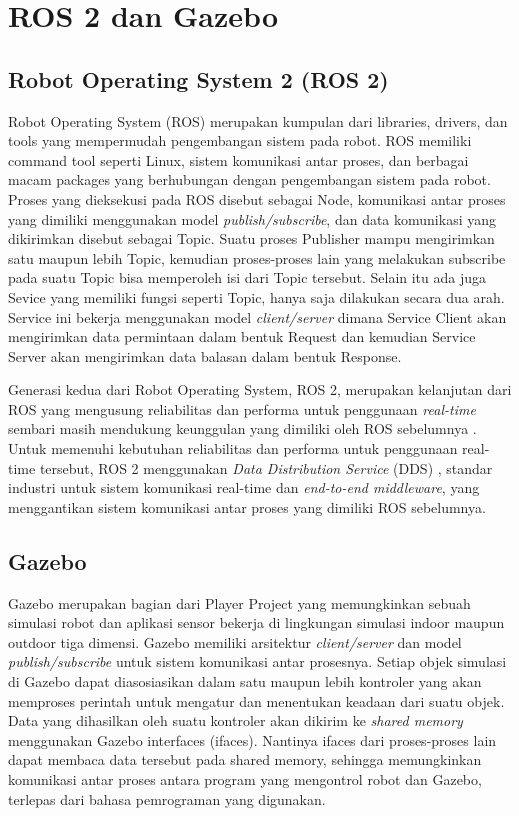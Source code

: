 \section{ROS 2 dan Gazebo}
\label{sec:rosgazebo}

\subsection{Robot Operating System 2 (ROS 2)}
\label{subsec:ros2}

Robot Operating System (ROS) \citep{quigley2009} merupakan kumpulan dari libraries, drivers, dan tools yang mempermudah pengembangan sistem pada robot.
ROS memiliki command tool seperti Linux, sistem komunikasi antar proses, dan berbagai macam packages yang berhubungan dengan pengembangan sistem pada robot.
Proses yang dieksekusi pada ROS disebut sebagai Node, komunikasi antar proses yang dimiliki menggunakan model \emph{publish/subscribe}, dan data komunikasi yang dikirimkan disebut sebagai Topic.
Suatu proses Publisher mampu mengirimkan satu maupun lebih Topic, kemudian proses-proses lain yang melakukan subscribe pada suatu Topic bisa memperoleh isi dari Topic tersebut.
Selain itu ada juga Sevice yang memiliki fungsi seperti Topic, hanya saja dilakukan secara dua arah.
Service ini bekerja menggunakan model \emph{client/server} dimana Service Client akan mengirimkan data permintaan dalam bentuk Request dan kemudian Service Server akan mengirimkan data balasan dalam bentuk Response.

Generasi kedua dari Robot Operating System, ROS 2, merupakan kelanjutan dari ROS yang mengusung reliabilitas dan performa untuk penggunaan \emph{real-time} sembari masih mendukung keunggulan yang dimiliki oleh ROS sebelumnya \citep{maruyama2016}.
Untuk memenuhi kebutuhan reliabilitas dan performa untuk penggunaan real-time tersebut, ROS 2 menggunakan \emph{Data Distribution Service} (DDS) \citep{castellote2003} \citep{schlesselman2004}, standar industri untuk sistem komunikasi real-time dan \emph{end-to-end middleware}, yang menggantikan sistem komunikasi antar proses yang dimiliki ROS sebelumnya.

\subsection{Gazebo}
\label{subsec:gazebo}

Gazebo \citep{koenig2004} merupakan bagian dari Player Project \citep{gerkey2003} yang memungkinkan sebuah simulasi robot dan aplikasi sensor bekerja di lingkungan simulasi indoor maupun outdoor tiga dimensi.
Gazebo memiliki arsitektur \emph{client/server} dan model \emph{publish/subscribe} untuk sistem komunikasi antar prosesnya.
Setiap objek simulasi di Gazebo dapat diasosiasikan dalam satu maupun lebih kontroler yang akan memproses perintah untuk mengatur dan menentukan keadaan dari suatu objek.
Data yang dihasilkan oleh suatu kontroler akan dikirim ke \emph{shared memory} menggunakan Gazebo interfaces (ifaces).
Nantinya ifaces dari proses-proses lain dapat membaca data tersebut pada shared memory, sehingga memungkinkan komunikasi antar proses antara program yang mengontrol robot dan Gazebo, terlepas dari bahasa pemrograman yang digunakan.

